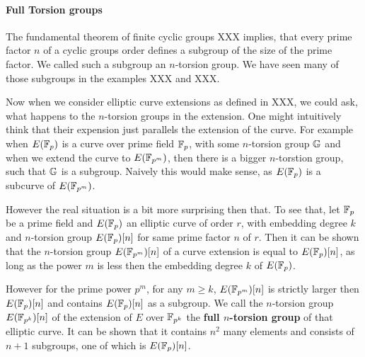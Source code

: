 \paragraph{Full Torsion groups} The fundamental theorem of finite cyclic groups XXX implies, that every prime factor $n$ of a cyclic groups order defines a subgroup of the size of the prime factor. We called such a subgroup an $n$-torsion group. We have seen many of those subgroups in the examples XXX and XXX.

Now when we consider elliptic curve extensions as defined in XXX, we could ask, what happens to the $n$-torsion groups in the extension. One might intuitively think that their expension just parallels the extension of the curve. For example when $E(\mathbb{F}_p)$ is a curve over prime field $\mathbb{F}_p$, with some $n$-torsion group $\mathbb{G}$ and when we extend the curve to $E(\mathbb{F}_{p^m})$, then there is a bigger $n$-torstion group, such that $\mathbb{G}$ is a subgroup. Naively this would make sense, as $E(\mathbb{F}_p)$ is a subcurve of $E(\mathbb{F}_{p^m})$.

However the real situation is a bit more surprising then that. To see that, let $\mathbb{F}_p$ be a prime field and $E(\mathbb{F}_p)$ an elliptic curve of order $r$, with embedding degree $k$ and $n$-torsion group $E(\mathbb{F}_p)[n]$ for same prime factor $n$ of $r$. Then it can be shown that the $n$-torsion group $E(\mathbb{F}_{p^m})[n]$ of a curve extension is equal to $E(\mathbb{F}_p)[n]$, as long as the power $m$ is less then the embedding degree $k$ of $E(\mathbb{F}_p)$.

However for the prime power $p^m$, for any $m\geq k$, $E(\mathbb{F}_{p^m})[n]$ is strictly larger then $E(\mathbb{F}_p)[n]$ and contains $E(\mathbb{F}_p)[n]$ as a subgroup. We call the $n$-torsion group $E(\mathbb{F}_{p^k})[n]$ of the extension of $E$ over $\mathbb{F}_{p^k}$ the \textbf{full $n$-torsion group} of that elliptic curve. It can be shown that it contains $n^2$ many elements and consists of $n+1$ subgroups, one of which is $E(\mathbb{F}_{p})[n]$.


